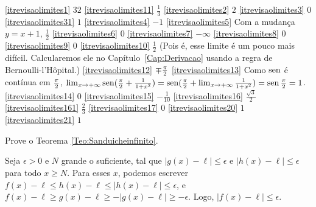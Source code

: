 \begin{exo}
\begin{multicols}{3}
\end{multicols}
\vspace{0.01cm}
\begin{sol}
\eqref{itrevisaolimites1} $32$
\eqref{itrevisaolimites11} $\frac13$
\eqref{itrevisaolimites2} $2$
\eqref{itrevisaolimites3} $0$
\eqref{itrevisaolimites31} $1$
\eqref{itrevisaolimites4} $-1$
\eqref{itrevisaolimites5} Com a mudança $y=x+1$, $\frac12$
\eqref{itrevisaolimites6} $0$
\eqref{itrevisaolimites7} $-\infty$
\eqref{itrevisaolimites8} $0$
\eqref{itrevisaolimites9} $0$
\eqref{itrevisaolimites10} $\tfrac12$ (Pois é, esse limite é
um pouco mais difícil. Calcularemos ele no
Capítulo~\ref{Cap:Derivacao} usando a regra de
Bernoulli-l'Hôpital.)
\eqref{itrevisaolimites12} $\mp \tfrac{\pi}{2}$
\eqref{itrevisaolimites13} Como $\operatorname{sen}$ é contínua em $\tfrac{\pi}{2}$,
$\lim_{{x}\to {+\infty}}\operatorname{sen}(\frac{\pi}{2}+\frac{1}{1+x^2})=\operatorname{sen}(\frac{
\pi}{2}+\lim_{{x}\to {+\infty}}\frac{1}{1+x^2})=\operatorname{sen} \tfrac{\pi}{2} =1$.
\eqref{itrevisaolimites14} $0$
\eqref{itrevisaolimites15} $-\frac{1}{10}$
\eqref{itrevisaolimites16} $\frac{\sqrt{3}}{2}$
\eqref{itrevisaolimites161} $\frac{2}{3}$
\eqref{itrevisaolimites17} $0$
\eqref{itrevisaolimites20} $1$ 
\eqref{itrevisaolimites21} $1$ 
\end{sol}
\end{exo}

\begin{exo} Prove o Teorema \ref{Teo:Sanduicheinfinito}.
\begin{sol}
Seja $\epsilon>0$ e $N$ grande o suficiente, tal que $|g(x)-\ell|\leq \epsilon$ e $|h(x)-\ell|\leq \epsilon$ para todo $x\geq N$.
Para esses $x$, podemos escrever $f(x)-\ell \leq h(x)-\ell\leq |h(x)-\ell|\leq \epsilon$, e $f(x)-\ell\geq g(x)-\ell\geq -|g(x)-\ell|\geq -\epsilon$. Logo, $|f(x)-\ell|\leq \epsilon$.
\end{sol}
\end{exo}

